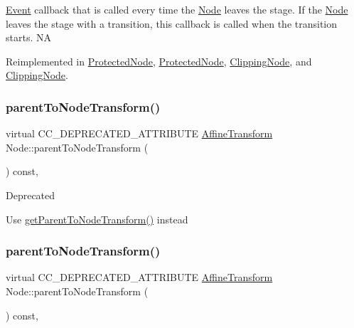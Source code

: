 \hyperlink{classEvent}{Event} callback that is called every time the \hyperlink{classNode}{Node} leaves the \textquotesingle{}stage\textquotesingle{}. If the \hyperlink{classNode}{Node} leaves the \textquotesingle{}stage\textquotesingle{} with a transition, this callback is called when the transition starts.  NA 

Reimplemented in \hyperlink{classProtectedNode_a3efa91524a31d8f0919be2db8af1ddc9}{Protected\+Node}, \hyperlink{classProtectedNode_a3f4bf0c9b9ec81b486f479d30fc1ed67}{Protected\+Node}, \hyperlink{classClippingNode_a4637553a7b0ae136a1e9cb1684b3db57}{Clipping\+Node}, and \hyperlink{classClippingNode_ab45e60bbd0afe536e806f05a963dd512}{Clipping\+Node}.

\mbox{\label{classNode_af309d9c24935db52112193619f3cd790}} 
\subsubsection{\texorpdfstring{parent\+To\+Node\+Transform()}{parentToNodeTransform()}\hspace{0.1cm}{\footnotesize\ttfamily [1/2]}}
{\footnotesize\ttfamily virtual C\+C\+\_\+\+D\+E\+P\+R\+E\+C\+A\+T\+E\+D\+\_\+\+A\+T\+T\+R\+I\+B\+U\+TE \hyperlink{structAffineTransform}{Affine\+Transform} Node\+::parent\+To\+Node\+Transform (\begin{DoxyParamCaption}{ }\end{DoxyParamCaption}) const\hspace{0.3cm}{\ttfamily [inline]}, {\ttfamily [virtual]}}

\begin{DoxyRefDesc}{Deprecated}
\item[\hyperlink{deprecated__deprecated000034}{Deprecated}]Use \hyperlink{classNode_a12aae4242a85aa5acfc03c97a018b621}{get\+Parent\+To\+Node\+Transform()} instead \end{DoxyRefDesc}
\mbox{\label{classNode_af309d9c24935db52112193619f3cd790}} 
\subsubsection{\texorpdfstring{parent\+To\+Node\+Transform()}{parentToNodeTransform()}\hspace{0.1cm}{\footnotesize\ttfamily [2/2]}}
{\footnotesize\ttfamily virtual C\+C\+\_\+\+D\+E\+P\+R\+E\+C\+A\+T\+E\+D\+\_\+\+A\+T\+T\+R\+I\+B\+U\+TE \hyperlink{structAffineTransform}{Affine\+Transform} Node\+::parent\+To\+Node\+Transform (\begin{DoxyParamCaption}{ }\end{DoxyParamCaption}) const\hspace{0.3cm}{\ttfamily [inline]}, {\ttfamily [virtual]}}

